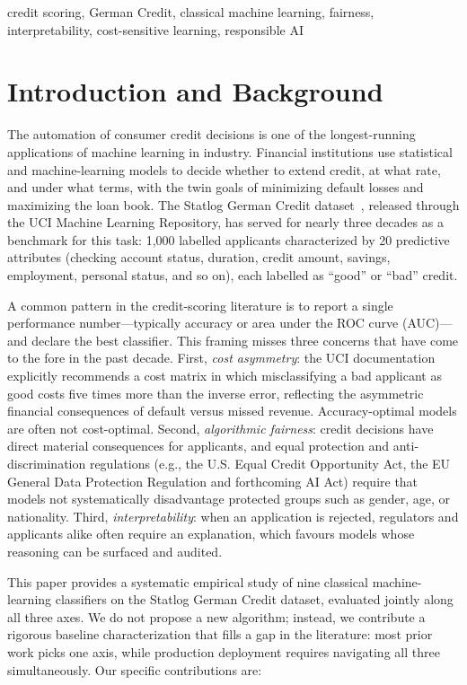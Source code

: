 \documentclass[conference]{IEEEtran}
\begin{document}
\begin{IEEEkeywords}
credit scoring, German Credit, classical machine learning, fairness, interpretability, cost-sensitive learning, responsible AI
\end{IEEEkeywords}

\section{Introduction and Background}\label{sec:intro}

The automation of consumer credit decisions is one of the longest-running applications of machine learning in industry. Financial institutions use statistical and machine-learning models to decide whether to extend credit, at what rate, and under what terms, with the twin goals of minimizing default losses and maximizing the loan book. The Statlog German Credit dataset~\cite{hofmann1994german}, released through the UCI Machine Learning Repository, has served for nearly three decades as a benchmark for this task: 1{,}000 labelled applicants characterized by 20 predictive attributes (checking account status, duration, credit amount, savings, employment, personal status, and so on), each labelled as ``good'' or ``bad'' credit.

A common pattern in the credit-scoring literature is to report a single performance number---typically accuracy or area under the ROC curve (AUC)---and declare the best classifier. This framing misses three concerns that have come to the fore in the past decade. First, \emph{cost asymmetry}: the UCI documentation explicitly recommends a cost matrix in which misclassifying a bad applicant as good costs five times more than the inverse error, reflecting the asymmetric financial consequences of default versus missed revenue. Accuracy-optimal models are often not cost-optimal. Second, \emph{algorithmic fairness}: credit decisions have direct material consequences for applicants, and equal protection and anti-discrimination regulations (e.g., the U.S. Equal Credit Opportunity Act, the EU General Data Protection Regulation and forthcoming AI Act) require that models not systematically disadvantage protected groups such as gender, age, or nationality. Third, \emph{interpretability}: when an application is rejected, regulators and applicants alike often require an explanation, which favours models whose reasoning can be surfaced and audited.

This paper provides a systematic empirical study of nine classical machine-learning classifiers on the Statlog German Credit dataset, evaluated jointly along all three axes. We do not propose a new algorithm; instead, we contribute a rigorous baseline characterization that fills a gap in the literature: most prior work picks one axis, while production deployment requires navigating all three simultaneously. Our specific contributions are:
\end{document}
